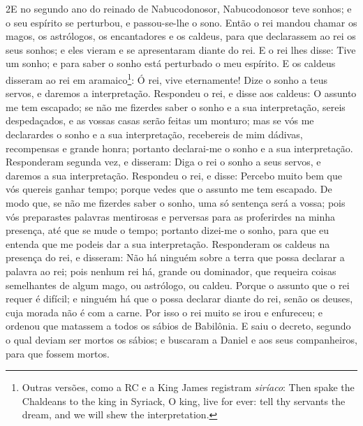 \medskip

\lettrine{2} E no segundo ano do reinado de Nabucodonosor,
Nabucodonosor teve sonhos; e o seu espírito se perturbou, e
passou-se-lhe o sono. Então o rei mandou chamar os magos, os
astrólogos, os encantadores e os caldeus, para que declarassem ao
rei os seus sonhos; e eles vieram e se apresentaram diante do rei.
E o rei lhes disse: Tive um sonho; e para saber o sonho está
perturbado o meu espírito. E os caldeus disseram ao rei em
aramaico\footnote{Outras versões, como a RC e a King James registram
\emph{siríaco}: Then spake the Chaldeans to the king in Syriack, O
king, live for ever: tell thy servants the dream, and we will shew
the interpretation.}: Ó rei, vive eternamente! Dize o sonho a teus
servos, e daremos a interpretação. Respondeu o rei, e disse aos
caldeus: O assunto me tem escapado; se não me fizerdes saber o sonho
e a sua interpretação, sereis despedaçados, e as vossas casas serão
feitas um monturo; mas se vós me declarardes o sonho e a sua
interpretação, recebereis de mim dádivas, recompensas e grande
honra; portanto declarai-me o sonho e a sua interpretação.
Responderam segunda vez, e disseram: Diga o rei o sonho a seus
servos, e daremos a sua interpretação. Respondeu o rei, e disse:
Percebo muito bem que vós quereis ganhar tempo; porque vedes que o
assunto me tem escapado. De modo que, se não me fizerdes saber o
sonho, uma só sentença será a vossa; pois vós preparastes palavras
mentirosas e perversas para as proferirdes na minha presença, até
que se mude o tempo; portanto dizei-me o sonho, para que eu entenda
que me podeis dar a sua interpretação. Responderam os caldeus
na presença do rei, e disseram: Não há ninguém sobre a terra que
possa declarar a palavra ao rei; pois nenhum rei há, grande ou
dominador, que requeira coisas semelhantes de algum mago, ou
astrólogo, ou caldeu. Porque o assunto que o rei requer é
difícil; e ninguém há que o possa declarar diante do rei, senão os
deuses, cuja morada não é com a carne. Por isso o rei muito
se irou e enfureceu; e ordenou que matassem a todos os sábios de
Babilônia. E saiu o decreto, segundo o qual deviam ser mortos
os sábios; e buscaram a Daniel e aos seus companheiros, para que
fossem mortos.

